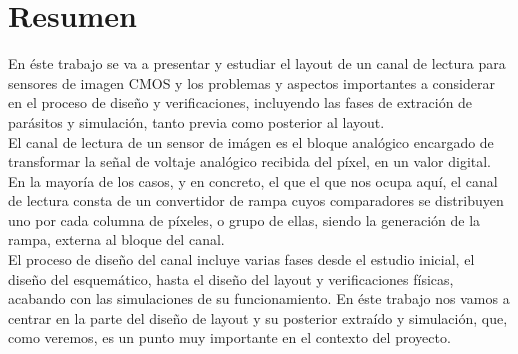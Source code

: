 \chapter*{Resumen}
\label{cap:resumen}

En éste trabajo se va a presentar y estudiar el layout de un canal de lectura
para sensores de imagen CMOS y los problemas y aspectos importantes a considerar
en el proceso de diseño y verificaciones, incluyendo las fases de extración de
parásitos y simulación, tanto previa como posterior al layout.\\

El canal de lectura de un sensor de imágen es el bloque analógico encargado de
transformar la señal de voltaje analógico recibida del píxel, en un valor digital.
En la mayoría de los casos, y en concreto, el que el que nos ocupa aquí, el canal de lectura
consta de un convertidor de rampa cuyos comparadores se distribuyen uno por cada
columna de píxeles, o grupo de ellas, siendo la generación de la rampa, externa
al bloque del canal.\\

El proceso de diseño del canal incluye varias fases desde el estudio inicial, el diseño
del esquemático, hasta el diseño del layout y verificaciones físicas, acabando con
las simulaciones de su funcionamiento. En éste trabajo nos vamos a centrar en la
parte del diseño de layout y su posterior extraído y simulación, que, como veremos,
es un punto muy importante en el contexto del proyecto.\\
